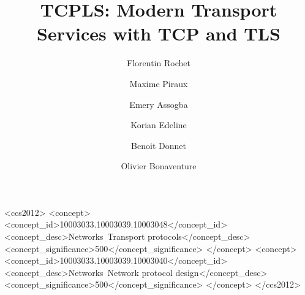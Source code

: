 \documentclass[sigconf]{acmart}
\begin{document}
\title{TCPLS: Modern Transport Services with TCP and TLS}

\author{Florentin Rochet}

\author{Maxime Piraux}

\author{Emery Assogba}

\author{Korian Edeline}

\author{Benoit Donnet}

\author{Olivier Bonaventure}

\begin{CCSXML}
<ccs2012>
<concept>
<concept_id>10003033.10003039.10003048</concept_id>
<concept_desc>Networks~Transport protocols</concept_desc>
<concept_significance>500</concept_significance>
</concept>
<concept>
<concept_id>10003033.10003039.10003040</concept_id>
<concept_desc>Networks~Network protocol design</concept_desc>
<concept_significance>500</concept_significance>
</concept>
</ccs2012>
\end{CCSXML}


\renewcommand{\shortauthors}{F. Rochet et al.}
\end{document}

